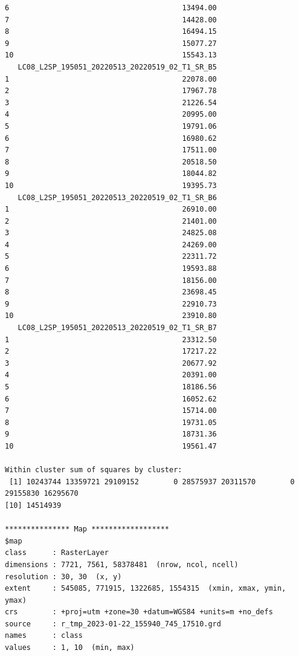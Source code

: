 \documentclass[knowledge,article,submit,pdftex,moreauthors]{Definitions/mdpi}
\begin{document}
\begin{small}
\begin{verbatim}
6                                        13494.00
7                                        14428.00
8                                        16494.15
9                                        15077.27
10                                       15543.13
   LC08_L2SP_195051_20220513_20220519_02_T1_SR_B5
1                                        22078.00
2                                        17967.78
3                                        21226.54
4                                        20995.00
5                                        19791.06
6                                        16980.62
7                                        17511.00
8                                        20518.50
9                                        18044.82
10                                       19395.73
   LC08_L2SP_195051_20220513_20220519_02_T1_SR_B6
1                                        26910.00
2                                        21401.00
3                                        24825.08
4                                        24269.00
5                                        22311.72
6                                        19593.88
7                                        18156.00
8                                        23698.45
9                                        22910.73
10                                       23910.80
   LC08_L2SP_195051_20220513_20220519_02_T1_SR_B7
1                                        23312.50
2                                        17217.22
3                                        20677.92
4                                        20391.00
5                                        18186.56
6                                        16052.62
7                                        15714.00
8                                        19731.05
9                                        18731.36
10                                       19561.47

Within cluster sum of squares by cluster:
 [1] 10243744 13359721 29109152        0 28575937 20311570        0 29155830 16295670
[10] 14514939

*************** Map ******************
$map
class      : RasterLayer 
dimensions : 7721, 7561, 58378481  (nrow, ncol, ncell)
resolution : 30, 30  (x, y)
extent     : 545085, 771915, 1322685, 1554315  (xmin, xmax, ymin, ymax)
crs        : +proj=utm +zone=30 +datum=WGS84 +units=m +no_defs 
source     : r_tmp_2023-01-22_155940_745_17510.grd 
names      : class 
values     : 1, 10  (min, max)
\end{verbatim} 
\end{small}



\end{document}
